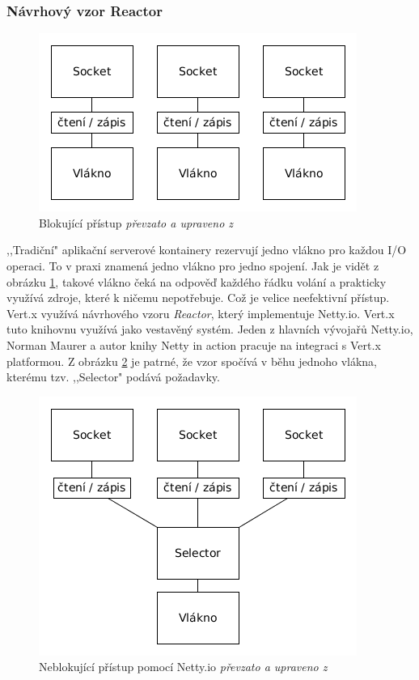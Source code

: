 \subsubsection{Návrhový vzor Reactor}

\begin{figure}[h]
\begin{centering}
\includegraphics[scale=0.55]{obrazky/blocking_pattern}
\par\end{centering}
\caption{Blokující přístup \emph{převzato a upraveno z \cite{nettyInAction}}\label{fig:blocking_pattern}}
\end{figure}

,,Tradiční" aplikační serverové kontainery rezervují jedno vlákno pro každou I/O operaci. To v praxi znamená jedno vlákno pro jedno spojení. Jak je vidět z obrázku \ref{fig:blocking_pattern}, takové vlákno čeká na odpověď každého řádku volání a prakticky využívá zdroje, které k ničemu nepotřebuje. Což je velice neefektivní přístup. Vert.x využívá návrhového vzoru \emph{Reactor}, který implementuje Netty.io. Vert.x tuto knihovnu využívá jako vestavěný systém. Jeden z hlavních vývojařů Netty.io, Norman Maurer a autor knihy Netty in action\cite{nettyInAction} pracuje na integraci s Vert.x platformou. Z obrázku \ref{fig:vertx_pattern} je patrné, že vzor spočívá v běhu jednoho vlákna, kterému tzv. ,,Selector" podává požadavky.

\begin{figure}[h]
\begin{centering}
\includegraphics[scale=0.55]{obrazky/vertx_pattern}
\par\end{centering}
\caption{Neblokující přístup pomocí Netty.io \emph{převzato a upraveno z \cite{nettyInAction}}\label{fig:vertx_pattern}}
\end{figure}


